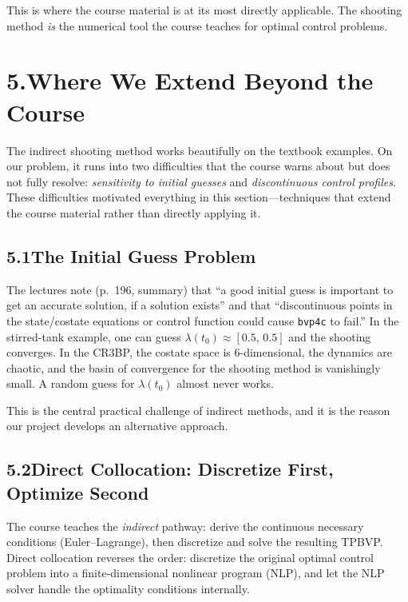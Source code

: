 \documentclass[11pt,letterpaper]{article}
\begin{document}
This is where the course material is at its most directly applicable. The shooting method \emph{is} the numerical tool the course teaches for optimal control problems.


\section{5.\quad Where We Extend Beyond the Course}

The indirect shooting method works beautifully on the textbook examples. On our problem, it runs into two difficulties that the course warns about but does not fully resolve: \emph{sensitivity to initial guesses} and \emph{discontinuous control profiles}. These difficulties motivated everything in this section---techniques that extend the course material rather than directly applying it.


\subsection{5.1\quad The Initial Guess Problem}

The lectures note (p.~196, summary) that ``a good initial guess is important to get an accurate solution, if a solution exists'' and that ``discontinuous points in the state/costate equations or control function could cause \texttt{bvp4c} to fail.'' In the stirred-tank example, one can guess $\lambda(t_0) \approx [0.5,\, 0.5]$ and the shooting converges. In the CR3BP, the costate space is 6-dimensional, the dynamics are chaotic, and the basin of convergence for the shooting method is vanishingly small. A random guess for $\lambda(t_0)$ almost never works.

This is the central practical challenge of indirect methods, and it is the reason our project develops an alternative approach.


\subsection{5.2\quad Direct Collocation: Discretize First, Optimize Second}

The course teaches the \emph{indirect} pathway: derive the continuous necessary conditions (Euler--Lagrange), then discretize and solve the resulting TPBVP. Direct collocation reverses the order: discretize the original optimal control problem into a finite-dimensional nonlinear program (NLP), and let the NLP solver handle the optimality conditions internally.
\end{document}
